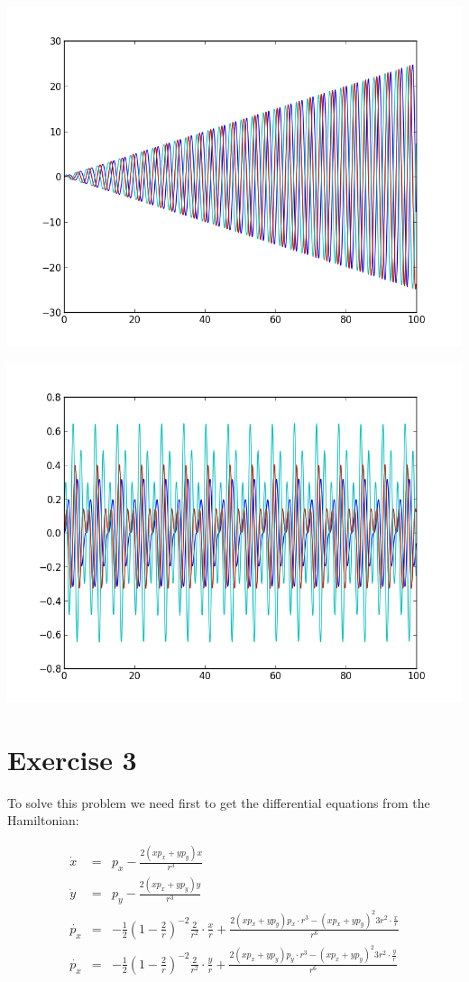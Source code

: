 \documentclass[%
]
{scrartcl}
\theoremstyle{plain}
\begin{document}
\begin{center}
\centering
\includegraphics[width=0.6\linewidth]{../cyclotronsNonRelativistic_o2.png}
\end{center}

\begin{center}
\centering
\includegraphics[width=0.6\linewidth]{../cyclotronsNonRelativistic_o3.png}
\end{center}

\section*{Exercise 3}

To solve this problem we need first to get the differential equations from the Hamiltonian:

\begin{eqnarray*}
\dot{x}&=&p_{x}-\frac{2(xp_{x}+yp_{y})x}{r^{3}}\\
\dot{y}&=&p_{y}-\frac{2(xp_{x}+yp_{y})y}{r^{3}}\\
\dot{p_{x}}&=&-\frac{1}{2}\left(1-\frac{2}{r}\right)^{-2}\frac{2}{r^{2}}\cdot\frac{x}{r}+\frac{2(xp_{x}+yp_{y})p_{x}\cdot r^{3}-(xp_{x}+yp_{y})^{2}3r^{2}\cdot\frac{x}{r}}{r^{6}}\\
\dot{p_{x}}&=&-\frac{1}{2}\left(1-\frac{2}{r}\right)^{-2}\frac{2}{r^{2}}\cdot\frac{y}{r}+\frac{2(xp_{x}+yp_{y})p_{y}\cdot r^{3}-(xp_{x}+yp_{y})^{2}3r^{2}\cdot\frac{y}{r}}{r^{6}}
\end{eqnarray*}\\
\end{document}
